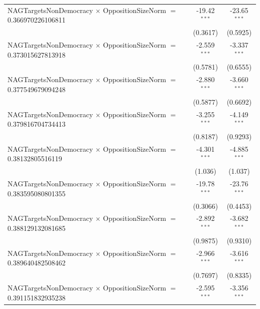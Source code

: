 \begin{tabular}{lcc}
   NAGTargetsNonDemocracy $\times$ OppositionSizeNorm $=$ 0.366970226106811     & -19.42$^{***}$       & -23.65$^{***}$\\   
                                                                                & (0.3617)             & (0.5925)\\   
   NAGTargetsNonDemocracy $\times$ OppositionSizeNorm $=$ 0.373015627813918     & -2.559$^{***}$       & -3.337$^{***}$\\   
                                                                                & (0.5781)             & (0.6555)\\   
   NAGTargetsNonDemocracy $\times$ OppositionSizeNorm $=$ 0.377549679094248     & -2.880$^{***}$       & -3.660$^{***}$\\   
                                                                                & (0.5877)             & (0.6692)\\   
   NAGTargetsNonDemocracy $\times$ OppositionSizeNorm $=$ 0.379816704734413     & -3.255$^{***}$       & -4.149$^{***}$\\   
                                                                                & (0.8187)             & (0.9293)\\   
   NAGTargetsNonDemocracy $\times$ OppositionSizeNorm $=$ 0.38132805516119      & -4.301$^{***}$       & -4.885$^{***}$\\   
                                                                                & (1.036)              & (1.037)\\   
   NAGTargetsNonDemocracy $\times$ OppositionSizeNorm $=$ 0.383595080801355     & -19.78$^{***}$       & -23.76$^{***}$\\   
                                                                                & (0.3066)             & (0.4453)\\   
   NAGTargetsNonDemocracy $\times$ OppositionSizeNorm $=$ 0.388129132081685     & -2.892$^{***}$       & -3.682$^{***}$\\   
                                                                                & (0.9875)             & (0.9310)\\   
   NAGTargetsNonDemocracy $\times$ OppositionSizeNorm $=$ 0.389640482508462     & -2.966$^{***}$       & -3.616$^{***}$\\   
                                                                                & (0.7697)             & (0.8335)\\   
   NAGTargetsNonDemocracy $\times$ OppositionSizeNorm $=$ 0.391151832935238     & -2.595$^{***}$       & -3.356$^{***}$\\   

\end{tabular}
